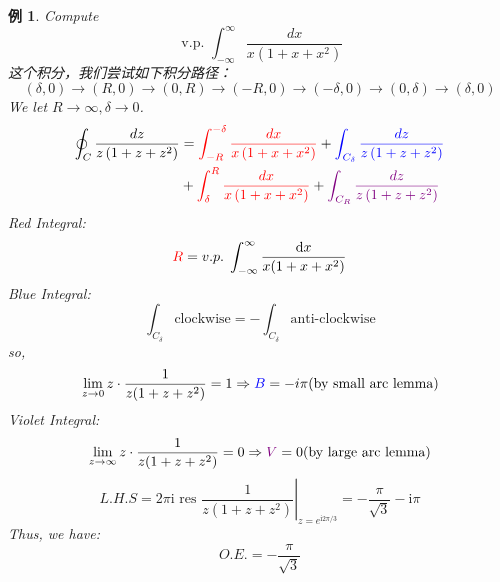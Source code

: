 \documentclass[10pt, a4paper, oneside]{ctexbook}
\newtheorem{example}[theorem]{例}
\def\D{\mathrm{d}}
\begin{document}
\begin{example}
    Compute $$\text { v.p. } \int_{-\infty}^{\infty} \frac{d x}{x\left(1+x+x^{2}\right)}$$
    \rm 这个积分，我们尝试如下积分路径：
    $$(\delta,0)\to(R,0)\to(0,R)\to(-R,0)\to(-\delta,0)\to(0,\delta)\to(\delta,0)$$
    We let $R\to\infty, \delta\to0$.
    $$
    \begin{aligned}
    \oint_{C} \frac{d z}{z\left(1+z+z^{2}\right)}&={\color{red} \int_{-R}^{-\delta} \frac{d x}{x\left(1+x+x^{2}\right)}}+{\color{blue}\int_{C_{\delta}} \frac{d z}{z\left(1+z+z^{2}\right)}}\\
    &+{\color{red}\int_{\delta}^{R} \frac{d x}{{x\left(1+x+x^{2}\right)}}} + {\color{violet}\int_{C_{R}} \frac{d z}{z\left(1+z+z^{2}\right)}}
    \end{aligned}
    $$
    {\color{red} Red Integral}:
    $$
    {\color{red} R}=v.p.\; \int_{-\infty}^\infty \frac{\D x}{x(1+x+x^2)}
    $$
    {\color{blue} Blue Integral}:
    $$
    \int_{C_\delta}\text{clockwise} = -\int_{C_\delta} \text{anti-clockwise}
    $$
    so,
    $$
    \lim_{z\to 0} z\cdot \frac{1}{z(1+z+z^2)}=1 \Rightarrow
    {\color{blue}B} =-i\pi (\text{by small arc lemma})
    $$
    {\color{violet} Violet Integral}:
    $$
    \lim_{z\to \infty} z\cdot \frac{1}{z(1+z+z^2)}=0 \Rightarrow
    {\color{violet} V}=0(\text{by large arc lemma})
    $$
    $$
    L.H.S= 2 \pi \mathrm{i} \text { res }\left.\frac{1}{z\left(1+z+z^{2}\right)}\right|_{z=e^{\mathrm{i} 2 \pi / 3}}=-\frac{\pi}{\sqrt{3}}-\mathrm{i} \pi
    $$
    Thus, we have:
    $$
    O.E.= -\frac{\pi}{\sqrt{3}}
    $$

\end{example}
\end{document}
